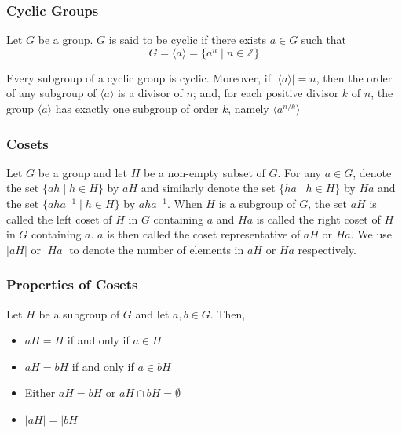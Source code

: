 \documentclass{beamer}
\newcommand{\Z}{\mathbb{Z}}
\begin{document}
	\begin{frame}
		\frametitle{Cyclic Groups}
		\begin{definition}
			Let $G$ be a group. $G$ is said to be cyclic if there exists $a\in G$ such that 
			\begin{equation*}
				G = \langle a\rangle = \{a^n\mid n\in\Z\}
			\end{equation*}
		\end{definition}
		\begin{theorem}
			Every subgroup of a cyclic group is cyclic. Moreover, if $|\langle a\rangle| = n$, then the order of any subgroup of $\langle a\rangle$ is a divisor of $n$; and, for each positive divisor $k$ of $n$, the group $\langle a\rangle$ has exactly one subgroup of order $k$, namely $\langle a^{n/k}\rangle$
		\end{theorem}
	\end{frame}
	\begin{frame}
		\frametitle{Cosets}
		\begin{definition}
			Let $G$ be a group and let $H$ be a non-empty subset of $G$. For any $a\in G$, denote the set $\{ah\mid h\in H\}$ by $aH$ and similarly denote the set $\{ha\mid h\in H\}$ by $Ha$ and the set $\{aha^{-1}\mid h\in H\}$ by $aha^{-1}$. When $H$ is a subgroup of $G$, the set $aH$ is called the left coset of $H$ in $G$ containing $a$ and $Ha$ is called the right coset of $H$ in $G$ containing $a$. $a$ is then called the coset representative of $aH$ or $Ha$. We use $|aH|$ or $|Ha|$ to denote the number of elements in $aH$ or $Ha$ respectively.
		\end{definition}
	\end{frame}
	\begin{frame}
		\frametitle{Properties of Cosets}
		\begin{theorem}
			Let $H$ be a subgroup of $G$ and let $a,b\in G$. Then,
			\begin{itemize}
				\item $aH = H$ if and only if $a\in H$
				\item $aH = bH$ if and only if $a\in bH$
				\item Either $aH = bH$ or $aH\cap bH = \emptyset$
				\item $|aH| = |bH|$
			\end{itemize}
		\end{theorem}
	\end{frame}
\end{document}
